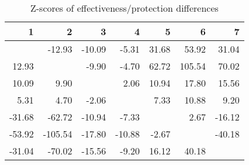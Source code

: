 \begin{table}[ht]
\centering
\begin{tabular}{rrrrrrr}
  \hline
1 & 2 & 3 & 4 & 5 & 6 & 7 \\ 
  \hline
 & -12.93 & -10.09 & -5.31 & 31.68 & 53.92 & 31.04 \\ 
  12.93 &  & -9.90 & -4.70 & 62.72 & 105.54 & 70.02 \\ 
  10.09 & 9.90 &  & 2.06 & 10.94 & 17.80 & 15.56 \\ 
  5.31 & 4.70 & -2.06 &  & 7.33 & 10.88 & 9.20 \\ 
  -31.68 & -62.72 & -10.94 & -7.33 &  & 2.67 & -16.12 \\ 
  -53.92 & -105.54 & -17.80 & -10.88 & -2.67 &  & -40.18 \\ 
  -31.04 & -70.02 & -15.56 & -9.20 & 16.12 & 40.18 &  \\ 
   \hline
\end{tabular}
\caption{Z-scores of effectiveness/protection differences} 
\end{table}
